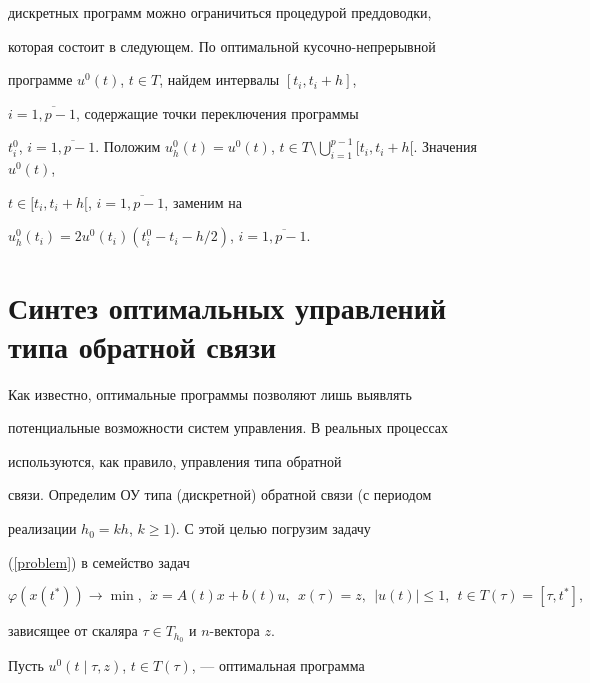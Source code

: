 дискретных программ можно ограничиться процедурой преддоводки,


которая состоит в следующем. По оптимальной кусочно-непрерывной


программе $u^0(t)$, $t\in T$, найдем интервалы $[t_i,t_i+h]$,


$i=\overline{1,p-1}$, содержащие точки переключения программы


$t_i^0$, $i=\overline{1,p-1}$. Положим $u_h^0(t)=u^0(t)$, $t\in


T\setminus\bigcup\limits_{i=1}^{p-1}[t_i,t_i+h[$. Значения $u^0(t)$,


$t\in [t_i,t_i+h[$, $i=\overline{1,p-1}$, заменим на


$u_h^0(t_i)=2u^0(t_i)(t_i^0-t_i-h/2)$, $i=\overline{1, p-1}$.








\section{Синтез оптимальных управлений типа обратной связи}





Как известно, оптимальные программы позволяют лишь выявлять


потенциальные возможности систем управления. В реальных процессах


используются, как правило, управления типа обратной


связи. Определим ОУ типа (дискретной) обратной связи (с периодом


реализации $h_0=kh$, $k\geq1$). С этой целью погрузим задачу


(\ref{problem}) в семейство задач


\begin{equation}\label{fam-problems}


\varphi(x(t^*))\rightarrow\min,\ \ \Dot{x}=A(t)x+b(t)u,\ \ 


x(\tau)=z,\ \ |u(t)|\leq1,\ \ t\in T(\tau)=[\tau,t^*],


\end{equation}


зависящее от скаляра $\tau\in T_{h_0}$ и $n$-вектора $z$.





Пусть $u^0(t\mid \tau,z)$, $t\in T(\tau)$, --- оптимальная программа


